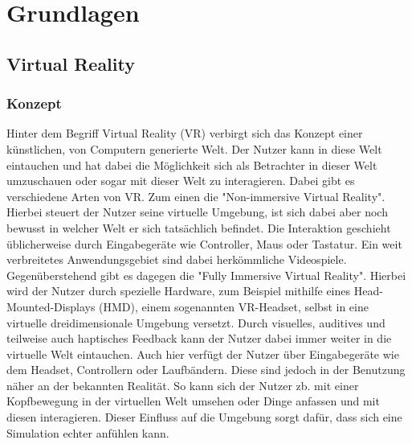 \section{Grundlagen}
\subsection{Virtual Reality}
\subsubsection{Konzept}

Hinter dem Begriff Virtual Reality (VR) verbirgt sich das Konzept einer
künstlichen, von Computern generierte Welt. Der Nutzer kann in diese Welt
eintauchen und hat dabei die Möglichkeit sich als Betrachter in dieser Welt
umzuschauen oder sogar mit dieser Welt zu interagieren.
Dabei gibt es verschiedene Arten von VR. Zum einen die "Non-immersive Virtual Reality".
Hierbei steuert der Nutzer seine virtuelle Umgebung, ist sich dabei aber noch bewusst
in welcher Welt er sich tatsächlich befindet. Die Interaktion geschieht üblicherweise durch
Eingabegeräte wie Controller, Maus oder Tastatur. Ein weit verbreitetes Anwendungsgebiet sind
dabei herkömmliche Videospiele.
Gegenüberstehend gibt es dagegen die "Fully Immersive Virtual Reality". Hierbei wird der Nutzer durch
spezielle Hardware, zum Beispiel mithilfe eines Head-Mounted-Displays (HMD), einem sogenannten VR-Headset,
selbst in eine virtuelle dreidimensionale Umgebung versetzt.
Durch visuelles, auditives und teilweise auch haptisches Feedback kann der Nutzer dabei immer weiter
in die virtuelle Welt eintauchen.
Auch hier verfügt der Nutzer über Eingabegeräte wie dem Headset, Controllern oder Laufbändern. Diese sind
jedoch in der Benutzung näher an der bekannten Realität. So kann sich der Nutzer zb. mit einer Kopfbewegung
in der virtuellen Welt umsehen oder Dinge anfassen und mit diesen interagieren. Dieser Einfluss auf die
Umgebung sorgt dafür, dass sich eine Simulation echter anfühlen kann.



